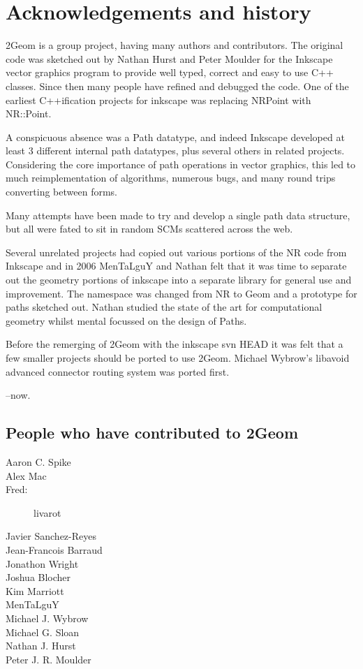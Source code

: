 \documentclass{book}
\begin{document}
\chapter{Acknowledgements and history}

2Geom is a group project, having many authors and contributors.  The
original code was sketched out by Nathan Hurst and Peter Moulder for
the Inkscape vector graphics program to provide well typed, correct
and easy to use C++ classes.  Since then many people have refined and
debugged the code.  One of the earliest C++ification projects for
inkscape was replacing NRPoint with NR::Point.

A conspicuous absence was a Path datatype, and indeed Inkscape
developed at least 3 different internal path datatypes, plus several
others in related projects.  Considering the core importance of path
operations in vector graphics, this led to much reimplementation of
algorithms, numerous bugs, and many round trips converting between
forms.

Many attempts have been made to try and develop a single path data
structure, but all were fated to sit in random SCMs scattered across
the web.

Several unrelated projects had copied out various portions of the NR
code from Inkscape and in 2006 MenTaLguY and Nathan felt that it was
time to separate out the geometry portions of inkscape into a
separate library for general use and improvement.  The namespace was
changed from NR to Geom and a prototype for paths sketched out.
Nathan studied the state of the art for computational geometry whilst
mental focussed on the design of Paths.

Before the remerging of 2Geom with the inkscape svn HEAD it was felt
that a few smaller projects should be ported to use 2Geom.  Michael
Wybrow's libavoid advanced connector routing system was ported first.

--now.

\pagebreak

\section{People who have contributed to 2Geom}
\begin{description}
\item[Aaron C. Spike]
\item[Alex Mac]
\item[Fred:] livarot
\item[Javier Sanchez-Reyes]
\item[Jean-Francois Barraud]
\item[Jonathon Wright]
\item[Joshua Blocher]
\item[Kim Marriott]
\item[MenTaLguY]
\item[Michael J. Wybrow]
\item[Michael G. Sloan]
\item[Nathan J. Hurst]
\item[Peter J. R. Moulder]
\end{description}
\end{document}
